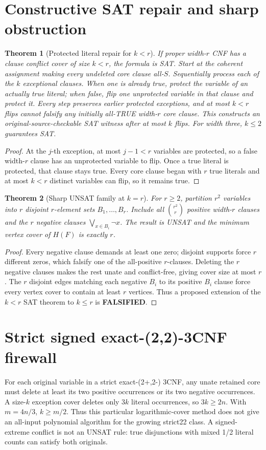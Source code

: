 \documentclass[10pt]{article}
\newtheorem{theorem}{Theorem}
\begin{document}
\section{Constructive SAT repair and sharp obstruction}
\begin{theorem}[Protected literal repair for $k<r$]
If proper width-$r$ CNF has a clause conflict cover of size $k<r$, the formula is SAT. Start at the coherent assignment making every undeleted core clause all-$S$. Sequentially process each of the $k$ exceptional clauses. When one is already true, protect the variable of an actually true literal; when false, flip one unprotected variable in that clause and protect it. Every step preserves earlier protected exceptions, and at most $k<r$ flips cannot falsify any initially all-TRUE width-$r$ core clause. This constructs an original-source-checkable SAT witness after at most $k$ flips. For width three, $k\le2$ guarantees SAT.
\end{theorem}
\begin{proof}
At the $j$-th exception, at most $j-1<r$ variables are protected, so a false width-$r$ clause has an unprotected variable to flip. Once a true literal is protected, that clause stays true. Every core clause began with $r$ true literals and at most $k<r$ distinct variables can flip, so it remains true.
\end{proof}
\begin{theorem}[Sharp UNSAT family at $k=r$]
For $r\ge2$, partition $r^2$ variables into $r$ disjoint $r$-element sets $B_1,\ldots,B_r$. Include all $\binom{r^2}{r}$ positive width-$r$ clauses and the $r$ negative clauses $\bigvee_{x\in B_i}\neg x$. The result is UNSAT and the minimum vertex cover of $H(F)$ is exactly $r$.
\end{theorem}
\begin{proof}
Every negative clause demands at least one zero; disjoint supports force $r$ different zeros, which falsify one of the all-positive $r$-clauses. Deleting the $r$ negative clauses makes the rest unate and conflict-free, giving cover size at most $r$. The $r$ disjoint edges matching each negative $B_i$ to its positive $B_i$ clause force every vertex cover to contain at least $r$ vertices. Thus a proposed extension of the $k<r$ SAT theorem to $k\le r$ is \textbf{FALSIFIED}.
\end{proof}
\section{Strict signed exact-(2,2)-3CNF firewall}
For each original variable in a strict exact-(2+,2-) 3CNF, any unate retained core must delete at least its two positive occurrences or its two negative occurrences. A size-$k$ exception cover deletes only $3k$ literal occurrences, so $3k\ge2n$. With $m=4n/3$, $k\ge m/2$. Thus this particular logarithmic-cover method does not give an all-input polynomial algorithm for the growing strict22 class. A signed-extreme conflict is not an UNSAT rule: true disjunctions with mixed 1/2 literal counts can satisfy both originals.
\end{document}
